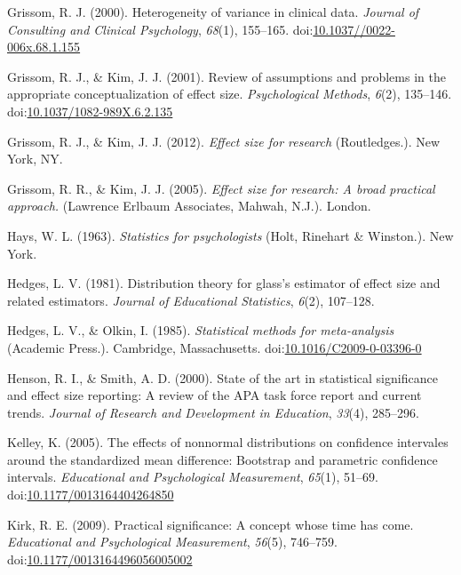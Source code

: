 \documentclass[
  man,floatsintext]{apa6}
\begin{document}
\leavevmode\hypertarget{ref-Grissom_2000}{}%
Grissom, R. J. (2000). Heterogeneity of variance in clinical data. \emph{Journal of Consulting and Clinical Psychology}, \emph{68}(1), 155--165. doi:\href{https://doi.org/10.1037//0022-006x.68.1.155}{10.1037//0022-006x.68.1.155}

\leavevmode\hypertarget{ref-Grissom_Kim_2001}{}%
Grissom, R. J., \& Kim, J. J. (2001). Review of assumptions and problems in the appropriate conceptualization of effect size. \emph{Psychological Methods}, \emph{6}(2), 135--146. doi:\href{https://doi.org/10.1037/1082-989X.6.2.135}{10.1037/1082-989X.6.2.135}

\leavevmode\hypertarget{ref-Grissom_and_Kim_2012}{}%
Grissom, R. J., \& Kim, J. J. (2012). \emph{Effect size for research} (Routledges.). New York, NY.

\leavevmode\hypertarget{ref-Grissom_and_kim_2005}{}%
Grissom, R. R., \& Kim, J. J. (2005). \emph{Effect size for research: A broad practical approach.} (Lawrence Erlbaum Associates, Mahwah, N.J.). London.

\leavevmode\hypertarget{ref-Hays_1963}{}%
Hays, W. L. (1963). \emph{Statistics for psychologists} (Holt, Rinehart \& Winston.). New York.

\leavevmode\hypertarget{ref-Hedges_1981}{}%
Hedges, L. V. (1981). Distribution theory for glass's estimator of effect size and related estimators. \emph{Journal of Educational Statistics}, \emph{6}(2), 107--128.

\leavevmode\hypertarget{ref-Hedges_Olkin_1985}{}%
Hedges, L. V., \& Olkin, I. (1985). \emph{Statistical methods for meta-analysis} (Academic Press.). Cambridge, Massachusetts. doi:\href{https://doi.org/10.1016/C2009-0-03396-0}{10.1016/C2009-0-03396-0}

\leavevmode\hypertarget{ref-Henson_Smith_2000}{}%
Henson, R. I., \& Smith, A. D. (2000). State of the art in statistical significance and effect size reporting: A review of the APA task force report and current trends. \emph{Journal of Research and Development in Education}, \emph{33}(4), 285--296.

\leavevmode\hypertarget{ref-Kelley_2005}{}%
Kelley, K. (2005). The effects of nonnormal distributions on confidence intervales around the standardized mean difference: Bootstrap and parametric confidence intervals. \emph{Educational and Psychological Measurement}, \emph{65}(1), 51--69. doi:\href{https://doi.org/10.1177/0013164404264850}{10.1177/0013164404264850}

\leavevmode\hypertarget{ref-Kirk_2009}{}%
Kirk, R. E. (2009). Practical significance: A concept whose time has come. \emph{Educational and Psychological Measurement}, \emph{56}(5), 746--759. doi:\href{https://doi.org/10.1177/0013164496056005002\%20}{10.1177/0013164496056005002 }
\end{document}
